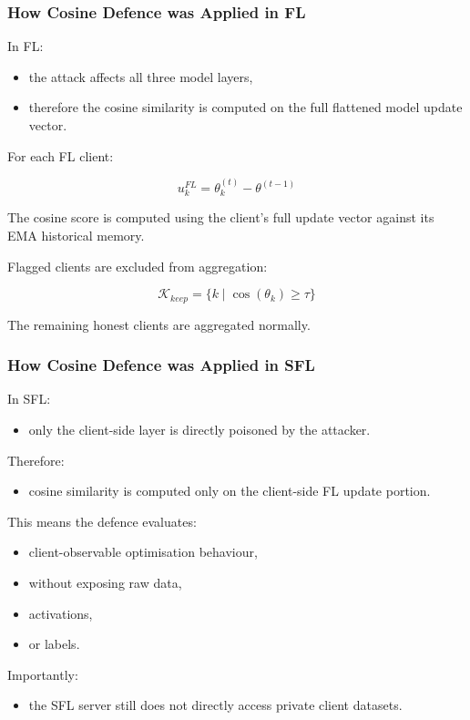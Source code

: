 \subsubsection*{How Cosine Defence was Applied in FL}

In FL:
\begin{itemize}
    \item the attack affects all three model layers,
    \item therefore the cosine similarity is computed on the full flattened model update vector.
\end{itemize}

For each FL client:

\[
u_k^{FL}
=
\theta_k^{(t)}
-
\theta^{(t-1)}
\]

The cosine score is computed using the client's full update vector against its EMA historical memory.

Flagged clients are excluded from aggregation:

\[
\mathcal{K}_{keep}
=
\{
k \mid \cos(\theta_k) \geq \tau
\}
\]

The remaining honest clients are aggregated normally.

\subsubsection*{How Cosine Defence was Applied in SFL}

In SFL:
\begin{itemize}
    \item only the client-side layer is directly poisoned by the attacker.
\end{itemize}

Therefore:
\begin{itemize}
    \item cosine similarity is computed only on the client-side FL update portion.
\end{itemize}

This means the defence evaluates:
\begin{itemize}
    \item client-observable optimisation behaviour,
    \item without exposing raw data,
    \item activations,
    \item or labels.
\end{itemize}

Importantly:
\begin{itemize}
    \item the SFL server still does not directly access private client datasets.
\end{itemize}


